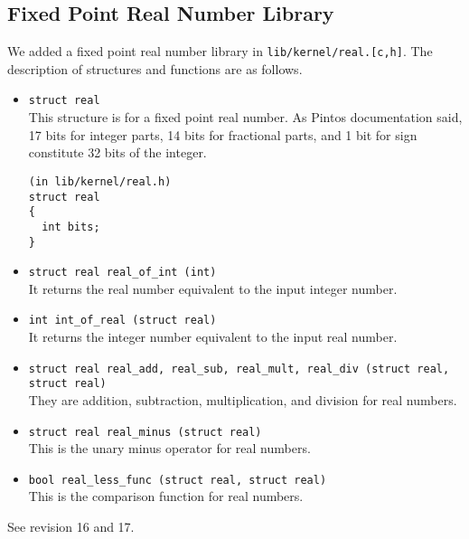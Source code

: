 \documentclass[a4paper,article,11pt,oneside]{article}
\begin{document}
\subsection{Fixed Point Real Number Library}
We added a fixed point real number library in
\texttt{lib/kernel/real.[c,h]}. The description of structures and
functions are as follows.
\begin{itemize}
\item \texttt{struct real}\\
This structure is for a fixed point real number. As Pintos
documentation said, 17 bits for integer parts, 14 bits for fractional
parts, and 1 bit for sign constitute 32 bits of the integer.
\begin{verbatim}
(in lib/kernel/real.h)
struct real
{
  int bits;
}
\end{verbatim}

\item \texttt{struct real real\_of\_int (int)}\\
It returns the real number equivalent to the input integer number.

\item \texttt{int int\_of\_real (struct real)}\\
It returns the integer number equivalent to the input real number.

\item \texttt{struct real real\_add, real\_sub, real\_mult, real\_div
    (struct real, struct real)}\\
They are addition, subtraction, multiplication, and division for real
numbers.

\item \texttt{struct real real\_minus (struct real)}\\
This is the unary minus operator for real numbers.

\item \texttt{bool real\_less\_func (struct real, struct real)}\\
This is the comparison function for real numbers.

\end{itemize}

See revision 16 and 17.
\end{document}
